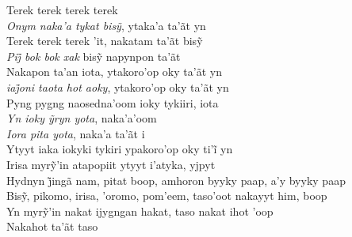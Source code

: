 \begin{linenumbers}\begingroup\raggedright

\noindent   Terek terek terek terek\\
  \emph{Onym naka’a tykat bisỹ}, ytaka’a ta’ãt yn\\
  Terek terek terek ’it, nakatam ta’ãt bisỹ\\
  \emph{Pij̃ bok bok xak} bisỹ napynpon ta’ãt\\
  Nakapon ta'an iota, ytakoro'op oky ta'ãt yn\\
  \emph{iaj̃oni taota hot aoky}, ytakoro’op oky ta’ãt yn\\
  Pyng pygng naosedna'oom ioky tykiiri, iota\\
  \emph{Yn ioky ỹryn yota}, naka’a’oom\\
  \emph{Iora pita yota}, naka'a ta'ãt i\\
  Ytyyt iaka iokyki tykiri ypakoro’op oky ti’ĩ yn\\
  Irisa myrỹ’in atapopiit ytyyt i’atyka, yjpyt\\
  Hydnyn j̃ingã nam, pitat boop, amhoron byyky paap, a’y byyky paap\\
  Bisỹ, pikomo, irisa, ’oromo, pom’eem, taso’oot nakayyt him, boop\\
  Yn myrỹ’in nakat ijygngan hakat, taso nakat ihot ’oop\\
  Nakahot ta'ãt taso

\end{linenumbers}\endgroup


